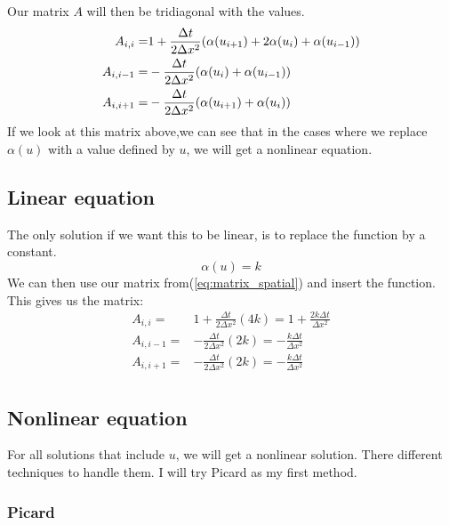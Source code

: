 \documentclass[norsk,11pt,a4paper]{article}
\begin{document}
Our matrix $A$ will then be tridiagonal with the values.
\begin{align} \label{eq:matrix_spatial}
A_{i,i} =& 1+\frac{\Delta t}{2\Delta
x^2}(\alpha(u_{i+1})+2\alpha(u_i)+\alpha(u_{i-1}))\notag \\
A_{i,i-1} =&-\frac{\Delta t}{2\Delta x^2}(\alpha(u_i)+\alpha(u_{i-1}))\notag \\
A_{i,i+1} =&-\frac{\Delta t}{2\Delta x^2}(\alpha(u_{i+1})+\alpha(u_i))
\end{align}                               
If we look at this matrix above,we can see that in the cases where we replace
$\alpha(u)$ with a value defined by $u$, we will get a nonlinear equation.
\subsection*{Linear equation}
The only solution if we want this to be linear, is to replace the function by a
constant.
\begin{equation}
	\alpha(u) = k
\end{equation}
We can then use our matrix from(\ref{eq:matrix_spatial}) and insert the function. This gives us
the matrix:
\begin{align*} \label{eq:matrix_constant}
A_{i,i} =& 1+\frac{\Delta t}{2\Delta x^2}(4k)=1+\frac{2k\Delta t}{\Delta x^2}\\
A_{i,i-1} =&-\frac{\Delta t}{2\Delta x^2}(2k)=-\frac{k \Delta t}{\Delta x^2}\\
A_{i,i+1} =&-\frac{\Delta t}{2\Delta x^2}(2k)=-\frac{k \Delta t}{\Delta x^2}\\
\end{align*}                               
\subsection*{Nonlinear equation}
For all solutions that include $u$, we will get a nonlinear solution. There
different techniques to handle them. I will try Picard as my first method.
\subsubsection*{Picard}
\end{document}

